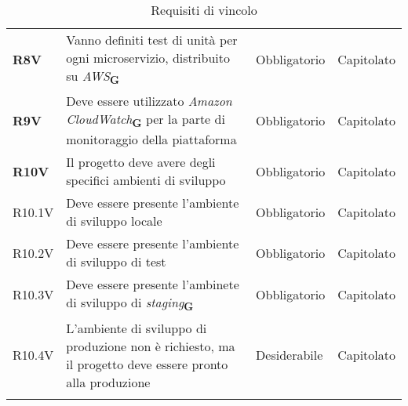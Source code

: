 \begin{center}
\begin{longtable}[!h]{p{50px} p{200px} p{100px} p{50px}}
        \textbf{R8V}                          & Vanno definiti test di unità per ogni microservizio, distribuito su \textit{AWS}\textsubscript{\textbf{G}}                                             & Obbligatorio             & Capitolato     \\
        \textbf{R9V}                          & Deve essere utilizzato \textit{Amazon CloudWatch}\textsubscript{\textbf{G}} per la parte di monitoraggio della piattaforma                             & Obbligatorio             & Capitolato     \\
        \textbf{R10V}                         & Il progetto deve avere degli specifici ambienti di sviluppo                                                                                            & Obbligatorio             & Capitolato     \\
        R10.1V                                & Deve essere presente l'ambiente di sviluppo locale                                                                                                     & Obbligatorio             & Capitolato     \\
        R10.2V                                & Deve essere presente l'ambiente di sviluppo di test                                                                                                    & Obbligatorio             & Capitolato     \\
        R10.3V                                & Deve essere presente l'ambinete di sviluppo di \textit{staging}\textsubscript{\textbf{G}}                                                              & Obbligatorio             & Capitolato     \\
        R10.4V                                & L'ambiente di sviluppo di produzione non è richiesto, ma il progetto deve essere pronto alla produzione                                                & Desiderabile             & Capitolato     \\
        \rowcolor{white}\caption{Requisiti di vincolo}
    \end{longtable}
\end{center}

\newpage
